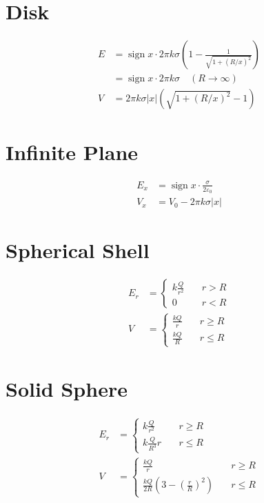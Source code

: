 \documentclass[10pt]{article}
\DeclareMathOperator{\sign}{sign}
\begin{document}
\begin{multicols*}{5}
\section{Disk}

\begin{align*}
    E &= \sign x \cdot 2\pi k \sigma \left({1 - \frac{1}{\sqrt{1 +
    (R/x)^2}}}\right)\\
      &= \sign x \cdot 2\pi k \sigma \quad (R \to \infty)\\
    V &= 2\pi k \sigma |x| \left({\sqrt{1 + (R / x)^2} - 1}\right)
\end{align*}

\section{Infinite Plane}

\begin{align*}
    E_x &= \sign x \cdot \frac{\sigma}{2\varepsilon_0}\\
    V_x &= V_0 - 2\pi k \sigma |x|
\end{align*}

\section{Spherical Shell}

\begin{align*}
    E_r &=
    \begin{cases}
    k \frac{Q}{r^2} & \quad r > R\\
    0 & \quad r < R
    \end{cases}\\
    V &=
    \begin{cases}
    \frac{kQ}{r} & \quad r \geq R\\
    \frac{kQ}{R} & \quad r \leq R
    \end{cases}
\end{align*}

\section{Solid Sphere}

\begin{align*}
    E_r &=
    \begin{cases}
    k \frac{Q}{r^2} & \quad r \geq R\\
    k \frac{Q}{R^3} r & \quad r \leq R
    \end{cases}\\
    V &=
    \begin{cases}
    \frac{kQ}{r} & \quad r \geq R\\
    \frac{kQ}{2R} \left({3 - \left({\frac{r}{R}}\right)^2}\right) &
    \quad r \leq R
    \end{cases}
\end{align*}


\end{multicols*}
\end{document}
